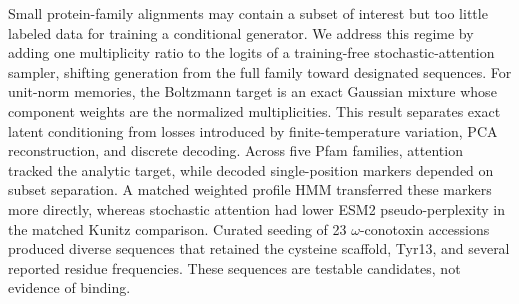 Small protein-family alignments may contain a subset of interest but too little labeled data
for training a conditional generator. We address this regime by adding one multiplicity ratio
to the logits of a training-free stochastic-attention sampler, shifting generation from the
full family toward designated sequences. For unit-norm memories, the Boltzmann target is an
exact Gaussian mixture whose component weights are the normalized multiplicities. This result
separates exact latent conditioning from losses introduced by finite-temperature variation,
PCA reconstruction, and discrete decoding. Across five Pfam families, attention tracked the
analytic target, while decoded single-position markers depended on subset separation. A matched
weighted profile HMM transferred these markers more directly, whereas stochastic attention had
lower ESM2 pseudo-perplexity in the matched Kunitz comparison. Curated seeding of 23
$\omega$-conotoxin accessions produced diverse sequences that retained the cysteine scaffold,
Tyr13, and several reported residue frequencies. These sequences are testable candidates, not
evidence of binding.
